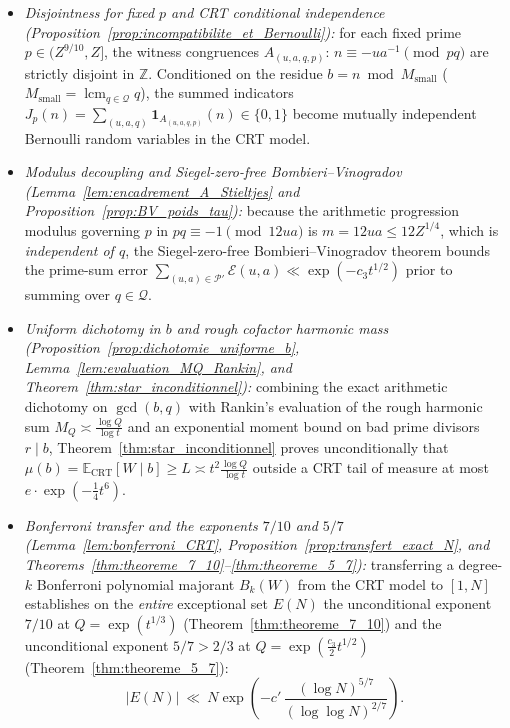 \documentclass[11pt, a4paper]{article}
\theoremstyle{plain}
\theoremstyle{definition}
\newcommand{\Z}{\mathbb{Z}}
\newcommand{\Ebb}{\mathbb{E}}
\newcommand{\ind}{\mathbf{1}}
\begin{document}
\begin{itemize}
    \item \emph{Disjointness for fixed $p$ and CRT conditional independence (Proposition~\ref{prop:incompatibilite_et_Bernoulli}):} for each fixed prime $p\in(Z^{9/10},Z]$, the witness congruences $A_{(u,a,q,p)}:\,n\equiv -ua^{-1}\pmod{pq}$ are strictly disjoint in $\Z$. Conditioned on the residue $b=n\bmod M_{\mathrm{small}}$ ($M_{\mathrm{small}}=\operatorname{lcm}_{q\in\mathcal{Q}}q$), the summed indicators $J_p(n)=\sum_{(u,a,q)}\ind_{A_{(u,a,q,p)}}(n)\in\{0,1\}$ become mutually independent Bernoulli random variables in the CRT model.
    \item \emph{Modulus decoupling and Siegel-zero-free Bombieri--Vinogradov (Lemma~\ref{lem:encadrement_A_Stieltjes} and Proposition~\ref{prop:BV_poids_tau}):} because the arithmetic progression modulus governing $p$ in $pq\equiv -1\pmod{12ua}$ is $m=12ua\le 12Z^{1/4}$, which is \emph{independent of $q$}, the Siegel-zero-free Bombieri--Vinogradov theorem bounds the prime-sum error $\sum_{(u,a)\in\mathcal{P}'}\mathcal{E}(u,a)\ll\exp(-c_3 t^{1/2})$ prior to summing over $q\in\mathcal{Q}$.
    \item \emph{Uniform dichotomy in $b$ and rough cofactor harmonic mass (Proposition~\ref{prop:dichotomie_uniforme_b}, Lemma~\ref{lem:evaluation_MQ_Rankin}, and Theorem~\ref{thm:star_inconditionnel}):} combining the exact arithmetic dichotomy on $\gcd(b,q)$ with Rankin's evaluation of the rough harmonic sum $M_Q\asymp\frac{\log Q}{\log t}$ and an exponential moment bound on bad prime divisors $r\mid b$, Theorem~\ref{thm:star_inconditionnel} proves unconditionally that $\mu(b)=\Ebb_{\mathrm{CRT}}[W\mid b]\ge L\asymp t^2\frac{\log Q}{\log t}$ outside a CRT tail of measure at most $e\cdot\exp(-\frac14 t^6)$.
    \item \emph{Bonferroni transfer and the exponents $7/10$ and $5/7$ (Lemma~\ref{lem:bonferroni_CRT}, Proposition~\ref{prop:transfert_exact_N}, and Theorems~\ref{thm:theoreme_7_10}--\ref{thm:theoreme_5_7}):} transferring a degree-$k$ Bonferroni polynomial majorant $B_k(W)$ from the CRT model to $[1,N]$ establishes on the \emph{entire} exceptional set $E(N)$ the unconditional exponent $7/10$ at $Q=\exp(t^{1/3})$ (Theorem~\ref{thm:theoreme_7_10}) and the unconditional exponent $5/7>2/3$ at $Q=\exp(\frac{c_3}{2}t^{1/2})$ (Theorem~\ref{thm:theoreme_5_7}):
    \[
    |E(N)|\ \ll\ N\exp\!\left(-c'\,\frac{(\log N)^{5/7}}{(\log\log N)^{2/7}}\right).
    \]
\end{itemize}
\end{document}
